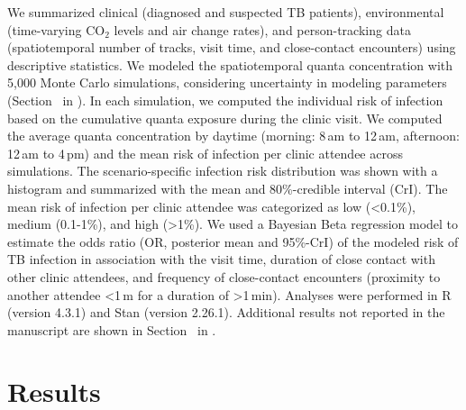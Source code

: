 \documentclass[fleqn,11pt]{wlscirep}
\begin{document}
We summarized clinical (diagnosed and suspected TB patients), environmental (time-varying CO$_2$ levels and air change rates), and person-tracking data (spatiotemporal number of tracks, visit time, and close-contact encounters) using descriptive statistics. We modeled the spatiotemporal quanta concentration with 5,000 Monte Carlo simulations, considering uncertainty in modeling parameters (Section~ in \supp). In each simulation, we computed the individual risk of infection based on the cumulative quanta exposure during the clinic visit. We computed the average quanta concentration by daytime (morning: 8\,am to 12\,am, afternoon: 12\,am to 4\,pm) and the mean risk of infection per clinic attendee across simulations. The scenario-specific infection risk distribution was shown with a histogram and summarized with the mean and 80\%-credible interval (CrI). The mean risk of infection per clinic attendee was categorized as low (<0.1\%), medium (0.1-1\%), and high (>1\%). We used a Bayesian Beta regression model to estimate the odds ratio (OR, posterior mean and 95\%-CrI) of the modeled risk of TB infection in association with the visit time, duration of close contact with other clinic attendees, and frequency of close-contact encounters (proximity to another attendee <1\,m for a duration of >1\,min). Analyses were performed in R (version 4.3.1) and Stan (version 2.26.1). Additional results not reported in the manuscript are shown in Section~ in \supp. 

\newpage

\section*{Results}
\end{document}
